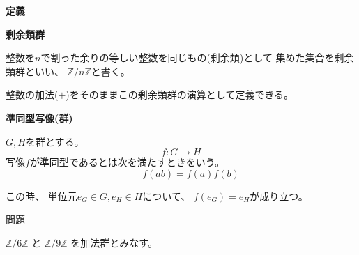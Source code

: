 \documentclass[12pt,b5paper]{ltjsarticle}
\begin{document}
\hrulefill
\textbf{定義}
\hrulefill

\textbf{剰余類群}

整数を$n$で割った余りの等しい整数を同じもの(剰余類)として
集めた集合を剰余類群といい、
$\mathbb{Z}/n\mathbb{Z}$と書く。

整数の加法($+$)をそのままこの剰余類群の演算として定義できる。

\textbf{準同型写像(群)}

$G,H$を群とする。
\begin{equation}
 f:G\to H
\end{equation}
写像$f$が準同型であるとは次を満たすときをいう。
\begin{equation}
 [{}^{\forall}a,b\in G] \qquad
  f(ab)=f(a)f(b)
\end{equation}

この時、
単位元$e_G\in G, e_H\in H$について、
$f(e_G)=e_H$が成り立つ。




\hrulefill
問題
\hrulefill

$\mathbb{Z}/6\mathbb{Z}$
と
$\mathbb{Z}/9\mathbb{Z}$
を加法群とみなす。
\end{document}
